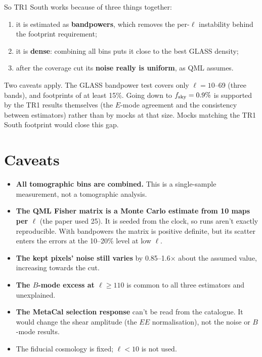 \documentclass[11pt]{article}
\begin{document}
So TR1 South works because of three things together:
\begin{enumerate}
\item it is estimated as \textbf{bandpowers}, which removes the per-$\ell$ instability behind the footprint
requirement;
\item it is \textbf{dense}: combining all bins puts it close to the best GLASS density;
\item after the coverage cut its \textbf{noise really is uniform}, as QML assumes.
\end{enumerate}
Two caveats apply. The GLASS bandpower test covers only $\ell=10$--69 (three bands), and footprints of at least 15\%.
Going down to $f_{\rm sky}=0.9\%$ is supported by the TR1 results themselves (the $E$-mode agreement and the
consistency between estimators) rather than by mocks at that size. Mocks matching the TR1 South footprint would close
this gap.

\section{Caveats}
\label{sec:caveats}
\begin{itemize}
\item \textbf{All tomographic bins are combined.} This is a single-sample measurement, not a tomographic analysis.
\item \textbf{The QML Fisher matrix is a Monte Carlo estimate from 10 maps per $\ell$} (the paper used 25). It is
seeded from the clock, so runs aren't exactly reproducible. With bandpowers the matrix is positive definite, but its
scatter enters the errors at the 10--20\% level at low $\ell$.
\item \textbf{The kept pixels' noise still varies} by 0.85--1.6$\times$ about the assumed value, increasing towards
the cut.
\item \textbf{The $B$-mode excess at $\ell\geq110$} is common to all three estimators and unexplained.
\item \textbf{The MetaCal selection response} can't be read from the catalogue. It would change the shear amplitude
(the $EE$ normalisation), not the noise or $B$-mode results.
\item The fiducial cosmology is fixed; $\ell<10$ is not used.
\end{itemize}
\end{document}
